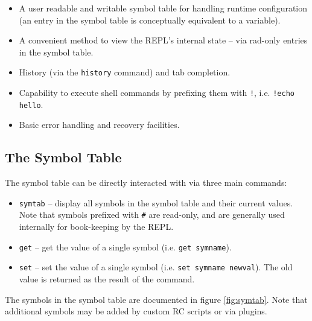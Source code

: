 \documentclass{book}
\begin{document}
\begin{itemize}

	\item A user readable and writable symbol table for handling
		runtime configuration (an entry in the symbol table is
		conceptually equivalent to a variable).

	\item A convenient method to view the REPL's internal state -- via
		rad-only entries in the symbol table.

	\item History (via the \texttt{history} command) and tab completion.

	\item Capability to execute shell commands by prefixing them with
		\texttt{!}, i.e. \texttt{!echo hello}.

	\item Basic error handling and recovery facilities.

\end{itemize}

\subsection{The Symbol Table}

The symbol table can be directly interacted with via three main commands:

\begin{itemize}

	\item \texttt{symtab} -- display all symbols in the symbol table and
		their current values. Note that symbols prefixed with
		\texttt{\#} are read-only, and are generally used internally for
		book-keeping by the REPL.

	\item \texttt{get} -- get the value of a single symbol (i.e.
		\texttt{get symname}).

	\item \texttt{set} -- set the value of a single symbol (i.e.
		\texttt{set symname newval}). The old value is returned as the
		result of the command.

\end{itemize}

The symbols in the symbol table are documented in figure \ref{fig:symtab}. Note
that additional symbols may be added by custom RC scripts or via plugins.
\end{document}
